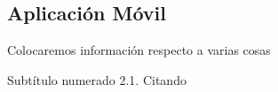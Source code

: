 \subsection{Aplicación Móvil}
Colocaremos información respecto a varias cosas

Subtítulo numerado 2.1. Citando \parencite{garcia2019}